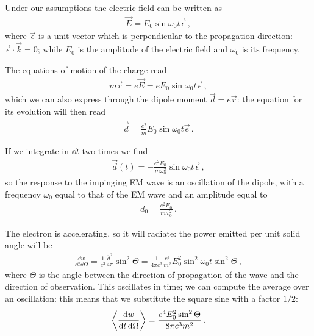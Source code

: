 \documentclass[main.tex]{subfiles}
\begin{document}

Under our assumptions the electric field can be written as 
%
\begin{align}
\vec{E} = E_0 \sin \omega_0 t \vec{\epsilon}
\,,
\end{align}
%
where \(\vec{\epsilon}\) is a unit vector which is perpendicular to the propagation direction: \(\vec{\epsilon} \cdot \vec{k} = 0\); while \(E_0 \) is the amplitude of the electric field and \(\omega_0\) is its frequency. 

The equations of motion of the charge read 
%
\begin{align}
m \ddot{\vec{r}} = e \vec{E} = e E_0 \sin \omega_0 t \vec{\epsilon}
\,,
\end{align}
%
which  we can also express through the dipole moment \(\vec{d} = e \vec{r}\): the equation for its evolution will then read 
%
\begin{align}
\ddot{\vec{d}} = \frac{e^2}{m} E_0 \sin \omega_0 t \vec{e}
\,.
\end{align}

If we integrate in \(\dd{t}\) two times we find 
%
\begin{align}
\vec{d} (t) = - \frac{e^2 E_0 }{m \omega_0^2} \sin \omega_0 t \vec{\epsilon}
\,,
\end{align}
%
so the response to the impinging EM wave is an oscillation of the dipole, with a frequency \(\omega_0\) equal to that of the EM wave and an amplitude equal to 
%
\begin{align}
d_0 = \frac{e^2 E_0 }{m \omega_0^2}
\,.
\end{align}

The electron is accelerating, so it will radiate: the power emitted per unit solid angle will be 
%
\begin{align}
\frac{ \dd{w}}{ \dd{t} \dd{\Omega }} = \frac{1}{c^3} \frac{ \ddot{d}^2}{4 \pi } \sin^2 \Theta 
= \frac{1}{4 \pi c^3} \frac{e^{4}}{m^2} E_0^2 \sin^2 \omega_0 t \sin^2 \Theta 
\,,
\end{align}
%
where \(\Theta \) is the angle between the direction of propagation of the wave and the direction of observation. 
This oscillates in time; we can compute the average over an oscillation: this means that we substitute the square sine with a factor \(1/2\): 
%
\begin{align}
\expval{\frac{ \dd{w}}{ \dd{t} \dd{\Omega }}} = 
\frac{e^{4} E_0^2 \sin^2 \Theta }{8 \pi c^3 m^2}
\,.
\end{align}
\end{document}
